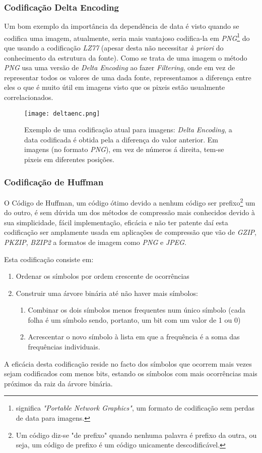 \documentclass[12pt,journal,compsoc]{IEEEtran}
\begin{document}
\subsubsection{Codificação Delta Encoding} 
Um bom exemplo da importância da dependência de data é visto quando se codifica uma imagem, atualmente, seria mais vantajoso codifica-la em \textit{PNG}\footnote{significa \textit{"Portable Network Graphics"}, um formato de codificação sem perdas de data para imagens.} do que usando a codificação \textit{LZ77} (apesar desta não necessitar \textit{à priori} do conhecimento da estrutura da fonte). Como se trata de uma imagem o método \textit{PNG} usa uma versão de  \textit{Delta Encoding} ao fazer \textit{Filtering}, onde em vez de representar todos os valores de uma dada fonte, representamos a diferença entre eles o que é muito útil em imagens visto que os pixeis estão usualmente correlacionados.

\begin{figure}[htp]
\texttt{[image: deltaenc.png]}
\caption{Exemplo de uma codificação atual para imagens: \textit{Delta Encoding}, a data codificada é obtida pela a diferença do valor anterior. Em imagens (no formato \textit{PNG}), em vez de números á direita, tem-se pixeis em diferentes posições.}
\end{figure}

\subsubsection{Codificação de Huffman} 

O Código de Huffman, um código ótimo devido a nenhum código ser prefixo\footnote{Um código diz-se "de prefixo" quando nenhuma palavra é prefixo da outra, ou seja, um código de prefixo é um código unicamente descodificável.} um do outro, é sem dúvida um dos métodos de compressão mais conhecidos devido à sua simplicidade, fácil implementação, eficácia e não ter patente daí esta codificação ser amplamente usada em aplicações de compressão que vão de \textit{GZIP}, \textit{PKZIP}, \textit{BZIP2} a formatos de imagem como \textit{PNG} e \textit{JPEG}.

Esta codificação consiste em:
\begin{enumerate}
    \item Ordenar os símbolos por ordem crescente de ocorrências
    \item Construir uma árvore binária até não haver mais símbolos:
    \begin{enumerate}
        \item Combinar os dois símbolos menos frequentes num único símbolo (cada folha é um símbolo sendo, portanto, um bit com um valor de 1 ou 0)
        \item Acrescentar o novo símbolo à lista em que a frequência é a soma das frequências individuais.
    \end{enumerate}
\end{enumerate}
A eficácia desta codificação reside no facto dos símbolos que ocorrem mais vezes sejam codificados com menos bits, estando os símbolos com mais ocorrências mais próximos da raiz da árvore binária.
\end{document}

